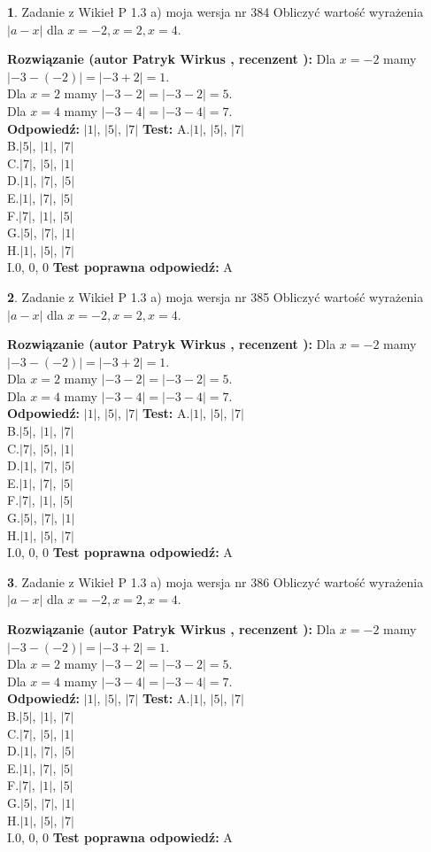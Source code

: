 \documentclass[12pt, a4paper]{article}
\theoremstyle{definition} %
\newtheorem{zad}{}
\newcommand{\zadStart}[1]{\begin{zad}#1\newline}
\newcommand{\zadStop}{\end{zad}}
\newcommand{\rozwStart}[2]{\noindent \textbf{Rozwiązanie (autor #1 , recenzent #2): }\newline}
\newcommand{\rozwStop}{\newline}
\newcommand{\odpStart}{\noindent \textbf{Odpowiedź:}\newline}
\newcommand{\odpStop}{\newline}
\newcommand{\testStart}{\noindent \textbf{Test:}\newline}
\newcommand{\testStop}{\newline}
\newcommand{\kluczStart}{\noindent \textbf{Test poprawna odpowiedź:}\newline}
\newcommand{\kluczStop}{\newline}
\begin{document}
\zadStart{Zadanie z Wikieł P 1.3 a) moja wersja nr 384}
Obliczyć wartość wyrażenia $|a - x|$ dla $x=-2,x=2,x=4$.
\zadStop
\rozwStart{Patryk Wirkus}{}
Dla $x = -2$ mamy $|-3 - (-2)| = |-3 + 2| = 1$.\\
Dla $x = 2$ mamy $|-3 - 2| = |-3 - 2| = 5$.\\
Dla $x = 4$ mamy $|-3 - 4| = |-3 - 4| = 7$.\\
\rozwStop
\odpStart
$|1|$, $|5|$, $|7|$
\odpStop
\testStart
A.$|1|$, $|5|$, $|7|$\\
B.$|5|$, $|1|$, $|7|$\\
C.$|7|$, $|5|$, $|1|$\\
D.$|1|$, $|7|$, $|5|$\\
E.$|1|$, $|7|$, $|5|$\\
F.$|7|$, $|1|$, $|5|$\\
G.$|5|$, $|7|$, $|1|$\\
H.$|1|$, $|5|$, $|7|$\\
I.$0$, $0$, $0$
\testStop
\kluczStart
A
\kluczStop



\zadStart{Zadanie z Wikieł P 1.3 a) moja wersja nr 385}
Obliczyć wartość wyrażenia $|a - x|$ dla $x=-2,x=2,x=4$.
\zadStop
\rozwStart{Patryk Wirkus}{}
Dla $x = -2$ mamy $|-3 - (-2)| = |-3 + 2| = 1$.\\
Dla $x = 2$ mamy $|-3 - 2| = |-3 - 2| = 5$.\\
Dla $x = 4$ mamy $|-3 - 4| = |-3 - 4| = 7$.\\
\rozwStop
\odpStart
$|1|$, $|5|$, $|7|$
\odpStop
\testStart
A.$|1|$, $|5|$, $|7|$\\
B.$|5|$, $|1|$, $|7|$\\
C.$|7|$, $|5|$, $|1|$\\
D.$|1|$, $|7|$, $|5|$\\
E.$|1|$, $|7|$, $|5|$\\
F.$|7|$, $|1|$, $|5|$\\
G.$|5|$, $|7|$, $|1|$\\
H.$|1|$, $|5|$, $|7|$\\
I.$0$, $0$, $0$
\testStop
\kluczStart
A
\kluczStop



\zadStart{Zadanie z Wikieł P 1.3 a) moja wersja nr 386}
Obliczyć wartość wyrażenia $|a - x|$ dla $x=-2,x=2,x=4$.
\zadStop
\rozwStart{Patryk Wirkus}{}
Dla $x = -2$ mamy $|-3 - (-2)| = |-3 + 2| = 1$.\\
Dla $x = 2$ mamy $|-3 - 2| = |-3 - 2| = 5$.\\
Dla $x = 4$ mamy $|-3 - 4| = |-3 - 4| = 7$.\\
\rozwStop
\odpStart
$|1|$, $|5|$, $|7|$
\odpStop
\testStart
A.$|1|$, $|5|$, $|7|$\\
B.$|5|$, $|1|$, $|7|$\\
C.$|7|$, $|5|$, $|1|$\\
D.$|1|$, $|7|$, $|5|$\\
E.$|1|$, $|7|$, $|5|$\\
F.$|7|$, $|1|$, $|5|$\\
G.$|5|$, $|7|$, $|1|$\\
H.$|1|$, $|5|$, $|7|$\\
I.$0$, $0$, $0$
\testStop
\kluczStart
A
\kluczStop
\end{document}
